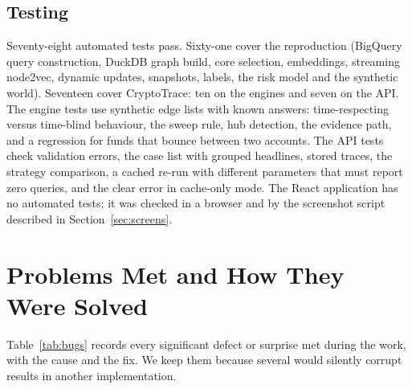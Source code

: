 \subsection{Testing}
Seventy-eight automated tests pass. Sixty-one cover the reproduction (BigQuery query construction, DuckDB graph build, core selection, embeddings, streaming node2vec, dynamic updates, snapshots, labels, the risk model and the synthetic world). Seventeen cover CryptoTrace: ten on the engines and seven on the API. The engine tests use synthetic edge lists with known answers: time-respecting versus time-blind behaviour, the sweep rule, hub detection, the evidence path, and a regression for funds that bounce between two accounts. The API tests check validation errors, the case list with grouped headlines, stored traces, the strategy comparison, a cached re-run with different parameters that must report zero queries, and the clear  error in cache-only mode. The React application has no automated tests; it was checked in a browser and by the screenshot script described in Section~\ref{sec:screens}.

\section{Problems Met and How They Were Solved}
\label{sec:problems}
Table~\ref{tab:bugs} records every significant defect or surprise met during the work, with the cause and the fix. We keep them because several would silently corrupt results in another implementation.

